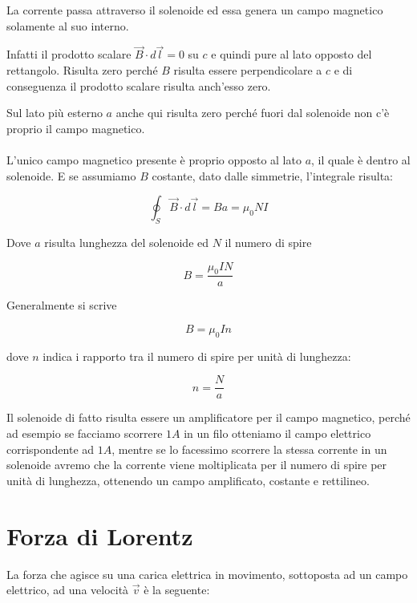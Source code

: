 La corrente passa attraverso il solenoide ed essa genera un campo magnetico solamente al suo interno.

Infatti il prodotto scalare $\vec{B} \cdot d\vec{l} = 0$ su $c$ e quindi pure al lato opposto del rettangolo. Risulta zero perché $B$ risulta essere perpendicolare a $c$ e di conseguenza il prodotto scalare risulta anch'esso zero.

Sul lato più esterno $a$ anche qui risulta zero perché fuori dal solenoide non c'è proprio il campo magnetico.

\paragraph{}
L'unico campo magnetico presente è proprio opposto al lato $a$, il quale è dentro al solenoide.
E se assumiamo $B$ costante, dato dalle simmetrie, l'integrale risulta:

\begin{equation*}
    \oint_S \vec{B}\cdot d\vec{l} = Ba = \mu_0NI
\end{equation*}

Dove $a$ risulta lunghezza del solenoide ed $N$ il numero di spire

\begin{equation*}
    B = \frac{\mu_0I N}{a}
\end{equation*}

Generalmente si scrive 

\begin{equation}
    B = \mu_0In
\end{equation}

dove $n$ indica i rapporto tra il numero di spire per unità di lunghezza:

\begin{equation*}
    n = \frac{N}{a}
\end{equation*}


Il solenoide di fatto risulta essere un amplificatore per il campo magnetico, perché ad esempio se facciamo scorrere $1A$ in un filo otteniamo il campo elettrico corrispondente ad $1A$, mentre se lo facessimo scorrere la stessa corrente in un solenoide avremo che la corrente viene moltiplicata per il numero di spire per unità di lunghezza, ottenendo un campo amplificato, costante e rettilineo.

\section{Forza di Lorentz}
La forza che agisce su una carica elettrica in movimento, sottoposta ad un campo elettrico, ad una velocità $\vec{v}$ è la seguente:

